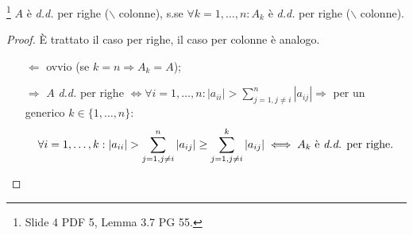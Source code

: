 \begin{theorem}\label{th:matrDDsseSottoMatrDD}\footnote{Slide 4 PDF 5, Lemma 3.7 PG 55.}
    $A$ è \textit{d.d.} per righe ($\backslash$ colonne), s.se $\forall k=1,\hdots,n:A_k$ è \textit{d.d.} per righe ($\backslash$ colonne).
\end{theorem}
\begin{proof}
    È trattato il caso per righe, il caso per colonne è analogo.
    \begin{itemize}
        \item [$\Leftarrow$] ovvio (se $k=n\Rightarrow A_k=A$);
        \item[$\Rightarrow$] $A$ \textit{d.d.} per righe $\iff \forall i = 1,\hdots,n: |a_{ii}|>\sum_{j=1, j\neq i}^n|a_{ij}|\Rightarrow$ per un generico $k\in\{1,\hdots,n\}$:
        \begin{equation*}
            \forall i= 1,\hdots, k: |a_{ii}|> \sum_{j=1, j\neq i}^n|a_{ij}|\geq \sum_{j=1,j\neq i}^k|a_{ij}|\iff A_k\text{ è \textit{d.d.} per righe.}
        \end{equation*}
    \end{itemize}
\end{proof}

